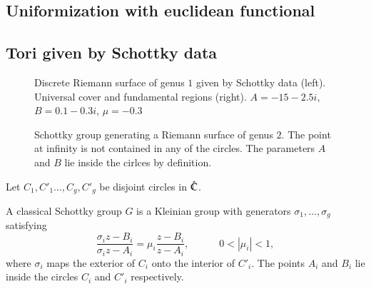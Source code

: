 \documentclass[Thesis.tex]{subfiles}
\begin{document}
\subsection{Uniformization with euclidean functional}

\subsection{Tori given by Schottky data}

\begin{figure}
\centering
{}
\caption{Discrete Riemann surface of genus $1$ given by Schottky data (left). Universal cover and fundamental regions (right). $A=-15-2.5i$, $B=0.1-0.3i$, $\mu=-0.3$}
\label{fig:schottky_g1}
\end{figure}

\begin{figure} 
\centering 
\scalebox{1.0}{}
\caption{Schottky group generating a Riemann surface of genus $2$. The point
at infinity is not contained in any of the circles. The parameters $A$ and $B$
lie inside the cirlces by definition.} 
\label{fig:schottky_group}
\end{figure}

Let $C_1,C'_1\ldots,C_g,C'_g$ be disjoint circles in $\hat{\mathbb C}$.
\begin{definition} A classical Schottky group $G$ is a Kleinian group with generators $\sigma_1,\ldots,\sigma_g$ satisfying
\[
\frac{\sigma_i z - B_i}{\sigma_i z - A_i} = \mu_i \frac{z - B_i}{z - A_i},
\quad\quad\quad 0 < \left|\mu_i\right|<1,
\]
where $\sigma_i$ maps the exterior of $C_i$ onto the interior of $C'_i$. The points $A_i$ and $B_i$ lie inside the circles $C_i$ and $C'_i$ respectively.
\end{definition}
\end{document}
